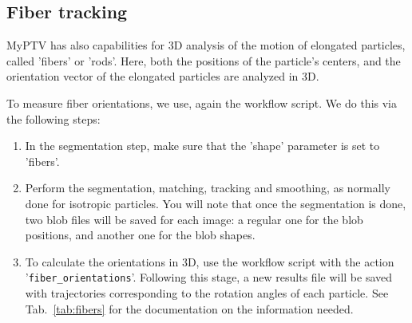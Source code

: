 \documentclass[10pt,a4paper]{article}
\begin{document}
\subsection{Fiber tracking} \label{sec:fibers}

MyPTV has also capabilities for 3D analysis of the motion of elongated particles, called 'fibers' or 'rods'. Here, both the positions of the particle's centers, and the orientation vector of the elongated particles are analyzed in 3D. 

To measure fiber orientations, we use, again the workflow script. We do this via the following steps:

\begin{enumerate}
	\item In the segmentation step, make sure that the 
	'shape' parameter is set to 'fibers'.
	
	\item Perform the segmentation, matching, tracking and smoothing, as normally done for isotropic particles. You will note that once the segmentation is done, two blob files will be saved for each image: a regular one for the blob positions, and another one for the blob shapes. 
	
	\item To calculate the orientations in 3D, use the workflow script with the action '\texttt{fiber\_orientations}'. Following this stage, a new results file will be saved with trajectories corresponding to the rotation angles of each particle. See Tab.~\ref{tab:fibers} for the documentation on the information needed. 
\end{enumerate}  
\end{document}
